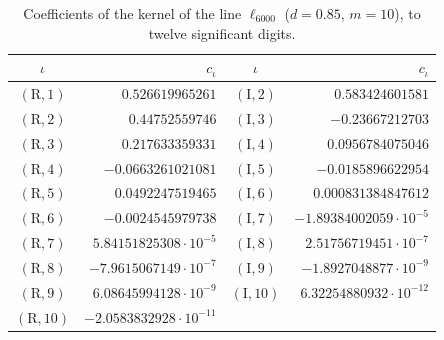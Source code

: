 \documentclass[11pt,reqno]{amsart}
\numberwithin{equation}{section}
\theoremstyle{definition}
\theoremstyle{remark}
\begin{document}
\begin{table}[ht]\centering\small
\begin{tabular}{@{}cr@{\quad}cr@{}}\toprule $\iota$ & $c_\iota$ & $\iota$ & $c_\iota$\\\midrule
$(\mathrm R,1)$ & $0.526619965261$ & $(\mathrm I,2)$ & $0.583424601581$\\
$(\mathrm R,2)$ & $0.44752559746$ & $(\mathrm I,3)$ & $-0.23667212703$\\
$(\mathrm R,3)$ & $0.217633359331$ & $(\mathrm I,4)$ & $0.0956784075046$\\
$(\mathrm R,4)$ & $-0.0663261021081$ & $(\mathrm I,5)$ & $-0.0185896622954$\\
$(\mathrm R,5)$ & $0.0492247519465$ & $(\mathrm I,6)$ & $0.000831384847612$\\
$(\mathrm R,6)$ & $-0.0024545979738$ & $(\mathrm I,7)$ & $-1.89384002059\cdot10^{-5}$\\
$(\mathrm R,7)$ & $5.84151825308\cdot10^{-5}$ & $(\mathrm I,8)$ & $2.51756719451\cdot10^{-7}$\\
$(\mathrm R,8)$ & $-7.9615067149\cdot10^{-7}$ & $(\mathrm I,9)$ & $-1.8927048877\cdot10^{-9}$\\
$(\mathrm R,9)$ & $6.08645994128\cdot10^{-9}$ & $(\mathrm I,10)$ & $6.32254880932\cdot10^{-12}$\\
$(\mathrm R,10)$ & $-2.0583832928\cdot10^{-11}$ & & \\
\bottomrule\end{tabular}
\caption{Coefficients of the kernel of the line $\ell_{6000}$ ($d=0.85$, $m=10$), to twelve significant digits.}\label{tab:kernel_D6000}\end{table}

\clearpage
\end{document}
